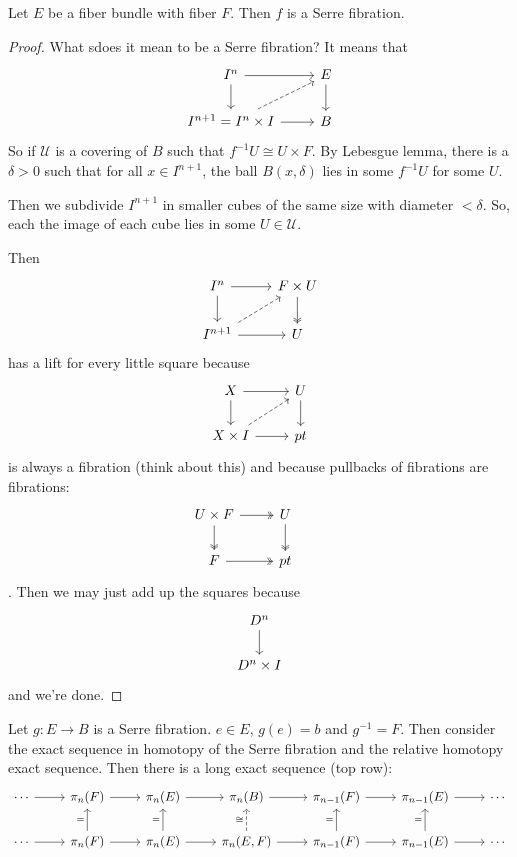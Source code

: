 \documentclass{article}
\numberwithin{equation}{section}
\newcommand{\Uc}{\mathcal{U}}
\begin{document}
\begin{prop}
	Let $E$ be a fiber bundle with fiber $F$. Then $f$ is a Serre fibration.
\end{prop}
\begin{proof}
	What sdoes it mean to be a Serre fibration? It means that
	\[\begin{tikzcd}
		I^n\arrow[r]\arrow[d]&E\arrow[d]\\
		I^{n+1}=I^n\times I\arrow[r]\arrow[ur,dashed]&B
	\end{tikzcd}\]
	So if $\Uc$ is a covering of $B$ such that $f^{-1}U\cong U\times F$. By Lebesgue lemma, there is a $\delta>0$ such that for all $x\in I^{n+1}$, the ball $B(x,\delta)$ lies in some $f^{-1}U$ for some $U$.
	
	Then we subdivide $I^{n+1}$ in smaller cubes of the same size with diameter $<\delta$. So, each the image of each cube lies in some $U\in\Uc$.
	
	Then
	\[\begin{tikzcd}
		I^n\arrow[d]\arrow[r]&F\times U\arrow[d,two heads]\\
		I^{n+1}\arrow[r]\arrow[ur,dashed]&U
	\end{tikzcd}\]
	has a lift for every little square because
	\[\begin{tikzcd}
		X\arrow[r]\arrow[d]&U\arrow[d]\\
		X\times I\arrow[r]\arrow[ur,dashed]&pt
	\end{tikzcd}\]
	is always a fibration {\color{orange}(think about this)} and because pullbacks of fibrations are fibrations:
	\[\begin{tikzcd}
		U\times F\arrow[r,two heads]\arrow[d,two heads]&U\arrow[d,two heads]&\\
		F\arrow[r,two heads]&pt
	\end{tikzcd}\].
	Then we may just add up the squares because
	\[\begin{tikzcd}
		D^n\arrow[d]\\
		D^n\times I
	\end{tikzcd}\]
	and we're done.
\end{proof}
\begin{prop}
	Let $g:E\to B$ is a Serre fibration. $e\in E$, $g(e)= b$ and $g^{-1}=F$. Then consider the exact sequence in homotopy of the Serre fibration and the relative homotopy exact sequence. Then there is a long exact sequence (top row):
	\[\begin{tikzcd}
		\cdots\arrow[r]&\pi_n(F)\arrow[r]&\pi_n(E)\arrow[r]&\pi_n(B)\arrow[r]&\pi_{n-1}(F)\arrow[r]&\pi_{n-1}(E)\arrow[r]&\cdots\\
		\cdots\arrow[r]&\pi_n(F)\arrow[r]\arrow[u,"="]&\pi_n(E)\arrow[r]\arrow[u,"="]&\pi_n(E,F)\arrow[r]\arrow[u,"\cong",dashed]&\pi_{n-1}(F)\arrow[r]\arrow[u,"="]&\pi_{n-1}(E)\arrow[r]\arrow[u,"="]&\cdots
	\end{tikzcd}\]
\end{prop}
\end{document}
